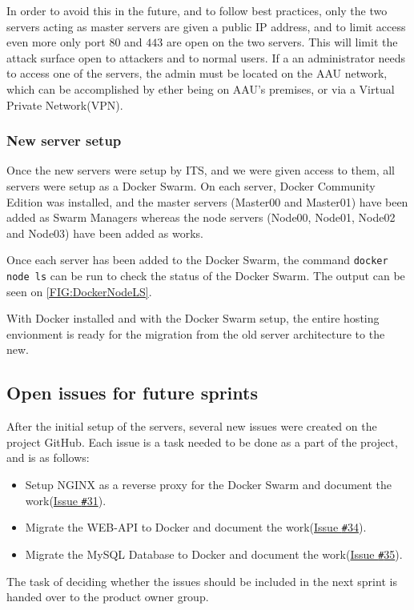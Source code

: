 In order to avoid this in the future, and to follow best practices, only the two servers acting as master servers are given a public IP address, and to limit access even more only port $80$ and $443$ are open on the two servers.
This will limit the attack surface open to attackers and to normal users.
If a an administrator needs to access one of the servers, the admin must be located on the AAU network, which can be accomplished by ether being on AAU's premises, or via a Virtual Private Network(VPN).

\subsubsection{New server setup}

Once the new servers were setup by ITS, and we were given access to them, all servers were setup as a Docker Swarm.
On each server, Docker Community Edition was installed, and the master servers (Master00 and Master01) have been added as Swarm Managers whereas the node servers (Node00, Node01, Node02 and Node03) have been added as works.

Once each server has been added to the Docker Swarm, the command \lstinline[columns=fixed]{docker node ls} can be run to check the status of the Docker Swarm.
The output can be seen on \autoref{FIG:DockerNodeLS}.

With Docker installed and with the Docker Swarm setup, the entire hosting envionment is ready for the migration from the old server architecture to the new.

\subsection{Open issues for future sprints}
After the initial setup of the servers, several new issues were created on the project GitHub.
Each issue is a task needed to be done as a part of the project, and is as follows:

\begin{itemize}
\item Setup NGINX as a reverse proxy for the Docker Swarm and document the work(\href{https://github.com/aau-giraf/wiki/issues/31}{Issue \texttt{\#}31}).
\item Migrate the WEB-API to Docker and document the work(\href{https://github.com/aau-giraf/wiki/issues/34}{Issue \texttt{\#}34}).
\item Migrate the MySQL Database to Docker and document the work(\href{https://github.com/aau-giraf/wiki/issues/35}{Issue \texttt{\#}35}).
\end{itemize}

The task of deciding whether the issues should be included in the next sprint is handed over to the product owner group.
